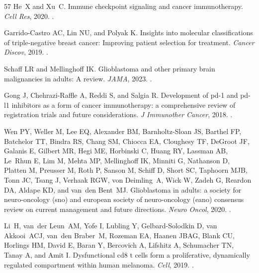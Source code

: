 \documentclass[11pt]{article}
\begin{document}
\begin{thebibliography}{57}
He~X and Xu~C.
\newblock Immune checkpoint signaling and cancer immunotherapy.
\newblock \emph{Cell Res}, 2020.
\newblock {}.

Garrido-Castro AC, Lin NU, and Polyak K.
\newblock Insights into molecular classifications of triple-negative breast
  cancer: Improving patient selection for treatment.
\newblock \emph{Cancer Discov}, 2019.
\newblock {}.

Schaff LR and Mellinghoff IK.
\newblock Glioblastoma and other primary brain malignancies in adults: A
  review.
\newblock \emph{JAMA}, 2023.
\newblock {}.

Gong J, Chehrazi-Raffle A, Reddi S, and Salgia R.
\newblock Development of pd-1 and pd-l1 inhibitors as a form of cancer
  immunotherapy: a comprehensive review of registration trials and future
  considerations.
\newblock \emph{J Immunother Cancer}, 2018.
\newblock {}.

Wen PY, Weller M, Lee EQ, Alexander BM, Barnholtz-Sloan JS, Barthel FP,
  Batchelor TT, Bindra RS, Chang SM, Chiocca EA, Cloughesy TF, DeGroot JF,
  Galanis E, Gilbert MR, Hegi ME, Horbinski C, Huang RY, Lassman AB, Le~Rhun E,
  Lim M, Mehta MP, Mellinghoff IK, Minniti G, Nathanson D, Platten M, Preusser
  M, Roth P, Sanson M, Schiff D, Short SC, Taphoorn MJB, Tonn JC, Tsang J,
  Verhaak RGW, von Deimling~A, Wick W, Zadeh G, Reardon DA, Aldape KD, and
  van~den Bent~MJ.
\newblock Glioblastoma in adults: a society for neuro-oncology (sno) and
  european society of neuro-oncology (eano) consensus review on current
  management and future directions.
\newblock \emph{Neuro Oncol}, 2020.
\newblock {}.

Li~H, van~der Leun~AM, Yofe I, Lubling Y, Gelbard-Solodkin D, van Akkooi~ACJ,
  van~den Braber~M, Rozeman EA, Haanen JBAG, Blank CU, Horlings HM, David E,
  Baran Y, Bercovich A, Lifshitz A, Schumacher TN, Tanay A, and Amit I.
\newblock Dysfunctional cd8 t cells form a proliferative, dynamically regulated
  compartment within human melanoma.
\newblock \emph{Cell}, 2019.
\newblock {}.


\end{thebibliography}
\end{document}

